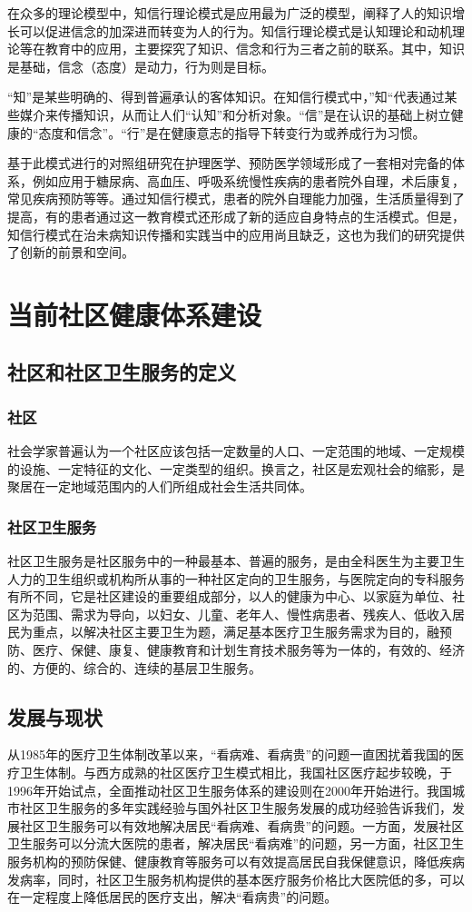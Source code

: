 在众多的理论模型中，知信行理论模式是应用最为广泛的模型，阐释了人的知识增长可以促进信念的加深进而转变为人的行为。知信行理论模式是认知理论和动机理论等在教育中的应用，主要探究了知识、信念和行为三者之前的联系。其中，知识是基础，信念（态度）是动力，行为则是目标。\cite{黄敬亨2006健康教育学}

“知”是某些明确的、得到普遍承认的客体知识。在知信行模式中，”知“代表通过某些媒介来传播知识，从而让人们“认知”和分析对象。“信”是在认识的基础上树立健康的“态度和信念”。“行”是在健康意志的指导下转变行为或养成行为习惯。\cite{金新政2003}

基于此模式进行的对照组研究在护理医学、预防医学领域形成了一套相对完备的体系，例如应用于糖尿病、高血压、呼吸系统慢性疾病的患者院外自理，术后康复，常见疾病预防等等。通过知信行模式，患者的院外自理能力加强，生活质量得到了提高，有的患者通过这一教育模式还形成了新的适应自身特点的生活模式。但是，知信行模式在治未病知识传播和实践当中的应用尚且缺乏，这也为我们的研究提供了创新的前景和空间。
\section{当前社区健康体系建设}
\subsection{社区和社区卫生服务的定义}
\subsubsection{社区}社会学家普遍认为一个社区应该包括一定数量的人口、一定范围的地域、一定规模的设施、一定特征的文化、一定类型的组织。换言之，社区是宏观社会的缩影，是聚居在一定地域范围内的人们所组成社会生活共同体。
\subsubsection{社区卫生服务}
社区卫生服务是社区服务中的一种最基本、普遍的服务，是由全科医生为主要卫生人力的卫生组织或机构所从事的一种社区定向的卫生服务，与医院定向的专科服务有所不同，它是社区建设的重要组成部分，以人的健康为中心、以家庭为单位、社区为范围、需求为导向，以妇女、儿童、老年人、慢性病患者、残疾人、低收入居民为重点，以解决社区主要卫生为题，满足基本医疗卫生服务需求为目的，融预防、医疗、保健、康复、健康教育和计划生育技术服务等为一体的，有效的、经济的、方便的、综合的、连续的基层卫生服务。 
\subsection{发展与现状}
从1985年的医疗卫生体制改革以来，“看病难、看病贵”的问题一直困扰着我国的医疗卫生体制。与西方成熟的社区医疗卫生模式相比，我国社区医疗起步较晚，于1996年开始试点，全面推动社区卫生服务体系的建设则在2000年开始进行。我国城市社区卫生服务的多年实践经验与国外社区卫生服务发展的成功经验告诉我们，发展社区卫生服务可以有效地解决居民“看病难、看病贵”的问题。一方面，发展社区卫生服务可以分流大医院的患者，解决居民“看病难”的问题，另一方面，社区卫生服务机构的预防保健、健康教育等服务可以有效提高居民自我保健意识，降低疾病发病率，同时，社区卫生服务机构提供的基本医疗服务价格比大医院低的多，可以在一定程度上降低居民的医疗支出，解决“看病贵”的问题。
